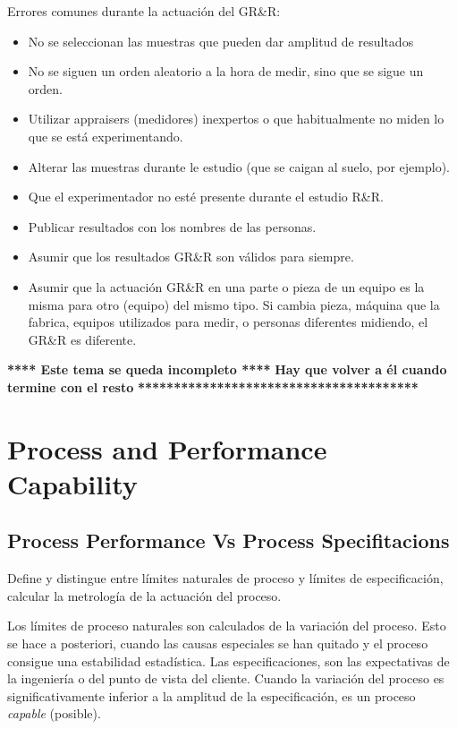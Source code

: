 \documentclass[]{article}
\begin{document}
Errores comunes durante la actuación del GR\&R:
\begin{itemize}
	\item No se seleccionan las muestras que pueden dar amplitud de resultados
	\item No se siguen un orden aleatorio a la hora de medir, sino que se sigue un orden.
	\item Utilizar appraisers (medidores) inexpertos o que habitualmente no miden lo que se está experimentando.
	\item Alterar las muestras durante le estudio (que se caigan al suelo, por ejemplo).
	\item Que el experimentador no esté presente durante el estudio R\&R.
	\item Publicar resultados con los nombres de las personas.
	\item Asumir que los resultados GR\&R son válidos para siempre.
	\item Asumir que la actuación GR\&R en una parte o pieza de un equipo es la misma para otro (equipo) del mismo tipo. Si cambia pieza, máquina que la fabrica, equipos utilizados para medir, o personas diferentes midiendo, el GR\&R es diferente.
\end{itemize}


\textbf{**** Este tema se queda incompleto ****} \newline 
\textbf{Hay que volver a él cuando termine con el resto} \newline
\textbf{***************************************} \newline

\pagebreak
\section{Process and Performance Capability}

\subsection{Process Performance Vs Process Specifitacions}

Define y distingue entre límites naturales de proceso y límites de especificación, calcular la metrología de la actuación del proceso.

Los límites de proceso naturales son calculados de la variación del proceso. Esto se hace a posteriori, cuando las causas especiales se han quitado y el proceso consigue una estabilidad estadística. Las especificaciones, son las expectativas de la ingeniería o del punto de vista del cliente. Cuando la variación del proceso es significativamente inferior a la amplitud de la especificación, es un proceso \textit{capable} (posible).
\end{document}
